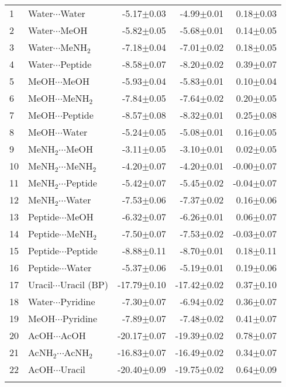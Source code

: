 \begin{longtable}{llrrr}
1 & Water$\cdots$Water & -5.17$\pm$0.03 & -4.99$\pm$0.01 & 0.18$\pm$0.03  \\
2 & Water$\cdots$MeOH & -5.82$\pm$0.05 & -5.68$\pm$0.01 & 0.14$\pm$0.05  \\
3 & Water$\cdots$MeNH$_2$ & -7.18$\pm$0.04 & -7.01$\pm$0.02 & 0.18$\pm$0.05  \\
4 & Water$\cdots$Peptide & -8.58$\pm$0.07 & -8.20$\pm$0.02 & 0.39$\pm$0.07  \\
5 & MeOH$\cdots$MeOH & -5.93$\pm$0.04 & -5.83$\pm$0.01 & 0.10$\pm$0.04  \\
6 & MeOH$\cdots$MeNH$_2$ & -7.84$\pm$0.05 & -7.64$\pm$0.02 & 0.20$\pm$0.05  \\
7 & MeOH$\cdots$Peptide & -8.57$\pm$0.08 & -8.32$\pm$0.01 & 0.25$\pm$0.08  \\
8 & MeOH$\cdots$Water & -5.24$\pm$0.05 & -5.08$\pm$0.01 & 0.16$\pm$0.05  \\
9 & MeNH$_2$$\cdots$MeOH & -3.11$\pm$0.05 & -3.10$\pm$0.01 & 0.02$\pm$0.05  \\
10 & MeNH$_2$$\cdots$MeNH$_2$ & -4.20$\pm$0.07 & -4.20$\pm$0.01 & -0.00$\pm$0.07  \\
11 & MeNH$_2$$\cdots$Peptide & -5.42$\pm$0.07 & -5.45$\pm$0.02 & -0.04$\pm$0.07  \\
12 & MeNH$_2$$\cdots$Water & -7.53$\pm$0.06 & -7.37$\pm$0.02 & 0.16$\pm$0.06  \\
13 & Peptide$\cdots$MeOH & -6.32$\pm$0.07 & -6.26$\pm$0.01 & 0.06$\pm$0.07  \\
14 & Peptide$\cdots$MeNH$_2$ & -7.50$\pm$0.07 & -7.53$\pm$0.02 & -0.03$\pm$0.07  \\
15 & Peptide$\cdots$Peptide & -8.88$\pm$0.11 & -8.70$\pm$0.01 & 0.18$\pm$0.11  \\
16 & Peptide$\cdots$Water & -5.37$\pm$0.06 & -5.19$\pm$0.01 & 0.19$\pm$0.06  \\
17 & Uracil$\cdots$Uracil (BP) & -17.79$\pm$0.10 & -17.42$\pm$0.02 & 0.37$\pm$0.10  \\
18 & Water$\cdots$Pyridine & -7.30$\pm$0.07 & -6.94$\pm$0.02 & 0.36$\pm$0.07  \\
19 & MeOH$\cdots$Pyridine & -7.89$\pm$0.07 & -7.48$\pm$0.02 & 0.41$\pm$0.07  \\
20 & AcOH$\cdots$AcOH & -20.17$\pm$0.07 & -19.39$\pm$0.02 & 0.78$\pm$0.07  \\
21 & AcNH$_2$$\cdots$AcNH$_2$ & -16.83$\pm$0.07 & -16.49$\pm$0.02 & 0.34$\pm$0.07  \\
22 & AcOH$\cdots$Uracil & -20.40$\pm$0.09 & -19.75$\pm$0.02 & 0.64$\pm$0.09  \\
$$
\end{longtable}

